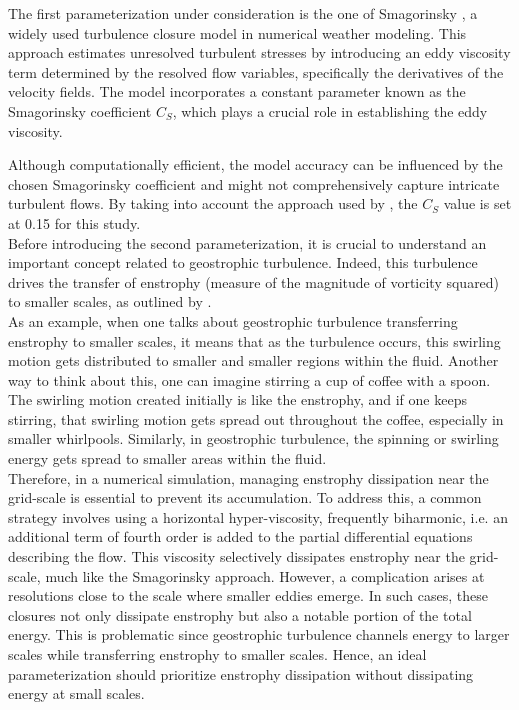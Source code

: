 The first parameterization under consideration is the one of Smagorinsky \citep{ClosureAnalytical2}, a widely used turbulence closure model in numerical weather modeling. This approach estimates unresolved turbulent stresses by introducing an eddy viscosity term determined by the resolved flow variables, specifically the derivatives of the velocity fields. The model incorporates a constant parameter known as the Smagorinsky coefficient $C_S$, which plays a crucial role in establishing the eddy viscosity.

\newpage

Although computationally efficient, the model accuracy can be influenced by the chosen Smagorinsky coefficient and might not comprehensively capture intricate turbulent flows. By taking into account the approach used by \cite{Benchmarking}, the $C_S$ value is set at 0.15 for this study.\\

Before introducing the second parameterization, it is crucial to understand an important concept related to geostrophic turbulence. Indeed, this turbulence drives the transfer of enstrophy (measure of the magnitude of vorticity squared) to smaller scales, as outlined by \cite{charney1971geostrophic}.\\ 

As an example, when one talks about geostrophic turbulence transferring enstrophy to smaller scales, it means that as the turbulence occurs, this swirling motion gets distributed to smaller and smaller regions within the fluid. Another way to think about this, one can imagine stirring a cup of coffee with a spoon. The swirling motion created initially is like the enstrophy, and if one keeps stirring, that swirling motion gets spread out throughout the coffee, especially in smaller whirlpools. Similarly, in geostrophic turbulence, the spinning or swirling energy gets spread to smaller areas within the fluid.\\

Therefore, in a numerical simulation, managing enstrophy dissipation near the grid-scale is essential to prevent its accumulation. To address this, a common strategy involves using a horizontal hyper-viscosity, frequently biharmonic, i.e. an additional term of fourth order is added to the partial differential equations describing the flow. This viscosity selectively dissipates enstrophy near the grid-scale, much like the Smagorinsky approach. However, a complication arises at resolutions close to the scale where smaller eddies emerge. In such cases, these closures not only dissipate enstrophy but also a notable portion of the total energy. This is problematic since geostrophic turbulence channels energy to larger scales while transferring enstrophy to smaller scales. Hence, an ideal parameterization should prioritize enstrophy dissipation without dissipating energy at small scales.\\

